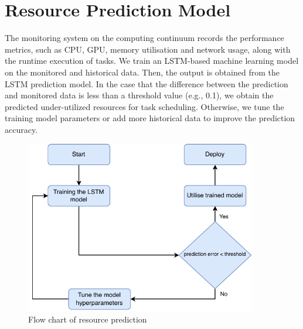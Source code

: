         
    \section{Resource Prediction Model}
    \label{sec:resource-prediction-model}

        The monitoring system on the computing continuum records the performance metrics, such as CPU, GPU, memory utilisation and network usage, along with the runtime execution of tasks. We train an LSTM-based machine learning model on the monitored and historical data. Then, the output is obtained from the LSTM prediction model. In the case that the difference between the prediction and monitored data is less than a threshold value (e.g., 0.1), we obtain the predicted under-utilized resources for task scheduling. Otherwise, we tune the training model parameters or add more historical data to improve the prediction accuracy.


        \begin{figure}
            \centering
            \includegraphics[width=0.9\textwidth]{figures/training_flowchart.pdf}
            \caption{Flow chart of resource prediction}
            \label{fig:flow-chart-of-resource-prediction}
        \end{figure}


